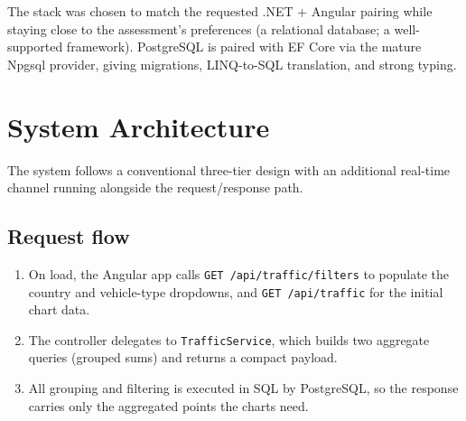 \documentclass[11pt,a4paper]{article}
\newcommand{\code}[1]{\texttt{\small #1}}
\begin{document}
\noindent The stack was chosen to match the requested .NET + Angular pairing
while staying close to the assessment's preferences (a relational database;
a well-supported framework). PostgreSQL is paired with EF Core via the mature
Npgsql provider, giving migrations, LINQ-to-SQL translation, and strong typing.

\section{System Architecture}
The system follows a conventional three-tier design with an additional
real-time channel running alongside the request/response path.

\begin{center}
\end{center}

\subsection{Request flow}
\begin{enumerate}[noitemsep]
  \item On load, the Angular app calls \code{GET /api/traffic/filters} to
        populate the country and vehicle-type dropdowns, and
        \code{GET /api/traffic} for the initial chart data.
  \item The controller delegates to \code{TrafficService}, which builds two
        aggregate queries (grouped sums) and returns a compact payload.
  \item All grouping and filtering is executed in SQL by PostgreSQL, so the
        response carries only the aggregated points the charts need.
\end{enumerate}
\end{document}
